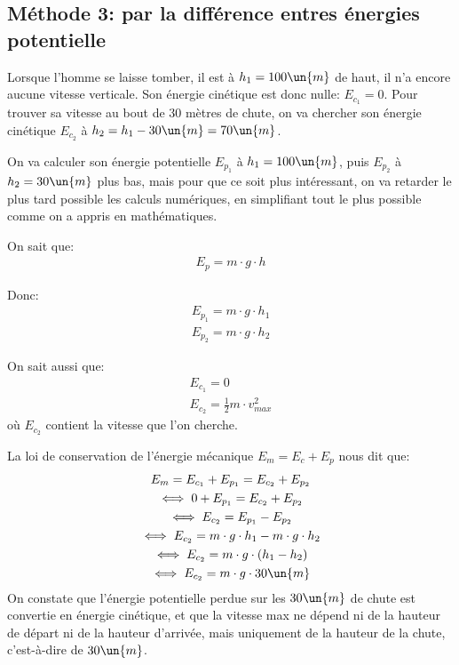 \subsection{Méthode 3: par la différence entres énergies potentielle}
Lorsque l'homme se laisse tomber, il est à $h_1 = 100 \un{m}$ de haut, il n'a encore aucune vitesse verticale. Son énergie cinétique est donc nulle: $E_{c_1} = 0$. 
Pour trouver sa vitesse au bout de 30 mètres de chute, on va chercher son énergie cinétique $E_{c_2}$ à $h_2=h_1-30\un{m}=70\un{m}$.

On va calculer son énergie potentielle $E_{p_1}$ à $h_1=100\un{m}$, puis $E_{p_2}$ à $h_2=30\un{m}$ plus bas, mais pour que ce soit plus intéressant, on va retarder le plus tard possible les calculs numériques, en simplifiant tout le plus possible comme on a appris en mathématiques.

On sait que:
\begin{gather*}
        E_p = m\cdot g \cdot h
\end{gather*}

Donc:
\begin{gather*}
    E_{p_1} = m\cdot g \cdot h_1 \\
    E_{p_2} = m\cdot g \cdot h_2
\end{gather*}

On sait aussi que:
\begin{gather*}
    E_{c_1} = 0 \\
    E_{c_2} = \frac{1}{2}m\cdot v_{max}^2
\end{gather*}
où $E_{c_2}$ contient la vitesse que l'on cherche.

La loi de conservation de l'énergie mécanique $E_m = E_c + E_p$ nous dit que:
\begin{gather*}
    E_m = E_{c_1} + E_{p_1} = E_{c_2} + E_{p_2} \\
    \iff 0 + E_{p_1} = E_{c_2} + E_{p_2} \\
    \iff E_{c_2} = E_{p_1} - E_{p_2} \\
    \iff E_{c_2} = m\cdot g \cdot h_1 - m\cdot g \cdot h_2 \\
    \iff E_{c_2} = m\cdot g \cdot (h_1 - h_2) \\
    \iff E_{c_2} = m\cdot g \cdot 30 \un{m}
\end{gather*}
On constate que l'énergie potentielle perdue sur les $30\un{m}$ de chute est convertie en énergie cinétique, et que la vitesse max ne dépend ni de la hauteur de départ ni de la hauteur d'arrivée, mais uniquement de la hauteur de la chute, c'est-à-dire de $30\un{m}$.

